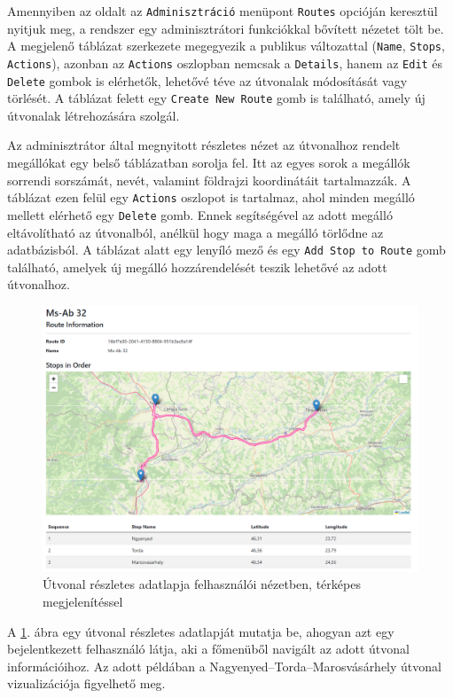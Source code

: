 Amennyiben az oldalt az \texttt{Adminisztráció} menüpont \texttt{Routes} opcióján keresztül nyitjuk meg, a rendszer egy adminisztrátori funkciókkal bővített nézetet tölt be. A megjelenő táblázat szerkezete megegyezik a publikus változattal (\texttt{Name}, \texttt{Stops}, \texttt{Actions}), azonban az \texttt{Actions} oszlopban nemcsak a \texttt{Details}, hanem az \texttt{Edit} és \texttt{Delete} gombok is elérhetők, lehetővé téve az útvonalak módosítását vagy törlését. A táblázat felett egy \texttt{Create New Route} gomb is található, amely új útvonalak létrehozására szolgál.

Az adminisztrátor által megnyitott részletes nézet az útvonalhoz rendelt megállókat egy belső táblázatban sorolja fel. Itt az egyes sorok a megállók sorrendi sorszámát, nevét, valamint földrajzi koordinátáit tartalmazzák. A táblázat ezen felül egy \texttt{Actions} oszlopot is tartalmaz, ahol minden megálló mellett elérhető egy \texttt{Delete} gomb. Ennek segítségével az adott megálló eltávolítható az útvonalból, anélkül hogy maga a megálló törlődne az adatbázisból. A táblázat alatt egy lenyíló mező és egy \texttt{Add Stop to Route} gomb található, amelyek új megálló hozzárendelését teszik lehetővé az adott útvonalhoz.

\begin{figure}[H]
    \centering
    \includegraphics[width=1\textwidth]{Szakdolgozat/Mellekletek/RoutesDetail.PNG}
    \caption{Útvonal részletes adatlapja felhasználói nézetben, térképes megjelenítéssel}
    \label{fig:route-detail-user}
\end{figure}

A \ref{fig:route-detail-user}. ábra egy útvonal részletes adatlapját mutatja be, ahogyan azt egy bejelentkezett felhasználó látja, aki a főmenüből navigált az adott útvonal információihoz. Az adott példában a Nagyenyed–Torda–Marosvásárhely útvonal vizualizációja figyelhető meg.


